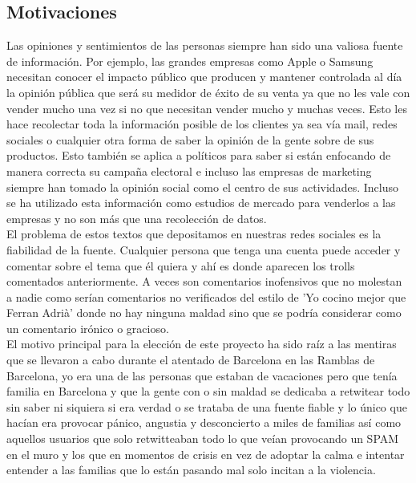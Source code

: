\documentclass[../all.tex]{subfiles}
\begin{document}
    
\newpage
\subsection{Motivaciones}
    Las opiniones y sentimientos de las personas siempre han sido una valiosa fuente de información. Por ejemplo, las grandes empresas como Apple o Samsung necesitan conocer el impacto público que producen y mantener controlada al día la opinión pública que será su medidor de éxito de su venta ya que no les vale con vender mucho una vez si no que necesitan vender mucho y muchas veces. Esto les hace recolectar toda la información posible de los clientes ya sea vía mail, redes sociales o cualquier otra forma de saber la opinión de la gente sobre de sus productos. Esto también se aplica a políticos para saber si están enfocando de manera correcta su campaña electoral e incluso las empresas de marketing siempre han tomado la opinión social como el centro de sus actividades. Incluso se ha utilizado esta información como estudios de mercado para venderlos a las empresas y no son más que una recolección de datos.\\
    
    El problema de estos textos que depositamos en nuestras redes sociales es la fiabilidad de la fuente. Cualquier persona que tenga una cuenta puede acceder y comentar sobre el tema que él quiera y ahí es donde aparecen los trolls comentados anteriormente. A veces son comentarios inofensivos que no molestan a nadie como serían comentarios no verificados del estilo de 'Yo cocino mejor que Ferran Adrià' donde no hay ninguna maldad sino que se podría considerar como un comentario irónico o gracioso.\\
    
    El motivo principal para la elección de este proyecto ha sido raíz a las mentiras que se llevaron a cabo durante el atentado de Barcelona en las Ramblas de Barcelona, yo era una de las personas que estaban de vacaciones pero que tenía familia en Barcelona y que la gente con o sin maldad se dedicaba a retwitear todo sin saber ni siquiera si era verdad o se trataba de una fuente fiable y lo único que hacían era provocar pánico, angustia y desconcierto a miles de familias así como aquellos usuarios que solo retwitteaban todo lo que veían provocando un SPAM en el muro y los que en momentos de crisis en vez de adoptar la calma e intentar entender a las familias que lo están pasando mal solo incitan a la violencia. 
    

\newpage
\end{document}
